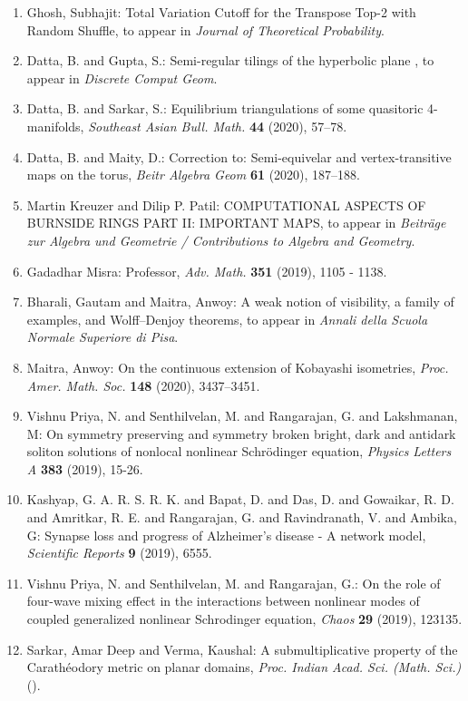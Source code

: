 \begin{enumerate}
\item Ghosh, Subhajit: Total Variation Cutoff for the Transpose Top-2 with Random Shuffle, to appear in \emph{Journal of Theoretical Probability}.
\item Datta, B. and Gupta, S.: Semi-regular tilings of the hyperbolic plane \label{bdsg_2019}, to appear in \emph{Discrete Comput Geom}.
\item Datta, B. and Sarkar, S.: Equilibrium triangulations of some quasitoric 4-manifolds, \emph{Southeast Asian Bull. Math.} {\bf 44} (2020), 57--78.
\item Datta, B. and Maity, D.: Correction to: Semi-equivelar and vertex-transitive maps on the torus, \emph{Beitr Algebra Geom} {\bf 61} (2020), 187--188.
\item Martin Kreuzer and Dilip P. Patil: COMPUTATIONAL ASPECTS OF BURNSIDE RINGS PART II: IMPORTANT MAPS, to appear in \emph{Beiträge zur Algebra und Geometrie / Contributions to Algebra and Geometry}.
\item Gadadhar Misra: Professor, \emph{Adv. Math.} {\bf 351} (2019), 1105 - 1138.
\item Bharali, Gautam and Maitra, Anwoy: A weak notion of visibility, a family of examples, and Wolff--Denjoy theorems, to appear in \emph{Annali della Scuola Normale Superiore di Pisa}.
\item Maitra, Anwoy: On the continuous extension of Kobayashi isometries, \emph{Proc. Amer. Math. Soc.} {\bf 148} (2020), 3437--3451.
\item Vishnu Priya, N. and Senthilvelan, M. and  Rangarajan, G. and Lakshmanan, M: On symmetry preserving and symmetry broken bright, dark and antidark soliton solutions of nonlocal nonlinear Schrödinger equation, \emph{Physics Letters A} {\bf 383} (2019), 15-26.
\item Kashyap, G. A. R. S. R. K. and Bapat, D. and Das, D. and Gowaikar, R. D. and Amritkar, R. E. and Rangarajan, G. and Ravindranath, V. and Ambika, G: Synapse loss and progress of Alzheimer’s disease - A network model, \emph{Scientific Reports} {\bf 9} (2019), 6555.
\item Vishnu Priya, N. and Senthilvelan, M. and Rangarajan, G.: On the role of four-wave mixing effect in the interactions between nonlinear modes of coupled generalized nonlinear Schrodinger equation, \emph{Chaos} {\bf 29} (2019), 123135.
\item Sarkar, Amar Deep and Verma, Kaushal: A submultiplicative property of the Carath\'{e}odory metric on planar domains, \emph{Proc. Indian Acad. Sci. (Math. Sci.)} {\bf } ().

\end{enumerate}
